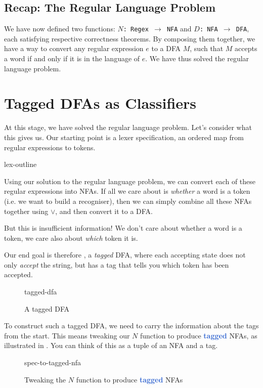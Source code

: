 \subsection{Recap: The Regular Language Problem}
We have now defined two functions: \texttt{$N$: Regex $\rightarrow$ NFA} and \texttt{$D$: NFA $\rightarrow$ DFA}, each satisfying respective correctness theorems. By composing them together, we have a way to convert any regular expression $e$ to a DFA $M$, such that $M$ accepts a word if and only if it is in the language of $e$. We have thus solved the regular language problem.

\section{Tagged DFAs as Classifiers}
At this stage, we have solved the regular language problem. Let's consider what this gives us. Our starting point is a lexer specification, an ordered map from regular expressions to tokens.
\begin{center}
    {lex-outline}
\end{center}

Using our solution to the regular language problem, we can convert each of these regular expressions into NFAs. If all we care about is \emph{whether} a word is a token (i.e. we want to build a recogniser), then we can simply combine all these NFAs together using $\lor$, and then convert it to a DFA. 

But this is insufficient information! We don't care about whether a word is a token, we care also about \emph{which} token it is.

Our end goal is therefore , a \emph{tagged} DFA, where each accepting state does not only \emph{accept} the string, but has a tag that tells you which token has been accepted.

\begin{figure}[H]
    \centering
    {tagged-dfa}
    \caption{A tagged DFA}
    \label{fig:tagged-dfa}
\end{figure}

To construct such a tagged DFA, we need to carry the information about the tags from the start. This means tweaking our $N$ function to produce \textbf{\textcolor{highlight}{tagged}} NFAs, as illustrated in . You can think of this as a tuple of an NFA and a tag.

\begin{figure}
    \centering
    {spec-to-tagged-nfa}
    \caption{Tweaking the $N$ function to produce \textbf{\textcolor{highlight}{tagged}} NFAs}
    \label{fig:tagged-nfas}
\end{figure}

